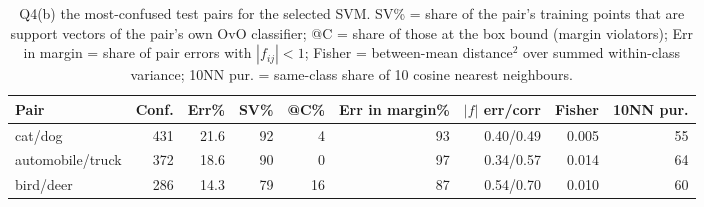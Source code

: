 \begin{table}[t]
\centering
\footnotesize
\setlength{\tabcolsep}{3.5pt}
\begin{adjustbox}{max width=\linewidth}
\begin{tabular}{lrrrrrrrr}
\toprule
Pair & Conf. & Err\% & SV\% & @C\% & Err in margin\% & $|f|$ err/corr & Fisher & 10NN pur. \\
\midrule
cat/dog & 431 & 21.6 & 92 & 4 & 93 & 0.40/0.49 & 0.005 & 55 \\
automobile/truck & 372 & 18.6 & 90 & 0 & 97 & 0.34/0.57 & 0.014 & 64 \\
bird/deer & 286 & 14.3 & 79 & 16 & 87 & 0.54/0.70 & 0.010 & 60 \\
\bottomrule
\end{tabular}
\end{adjustbox}
\caption{Q4(b) the most-confused test pairs for the selected SVM. SV\% = share of the pair's training points that are support vectors of the pair's own OvO classifier; @C = share of those at the box bound (margin violators); Err in margin = share of pair errors with $|f_{ij}|<1$; Fisher = between-mean distance$^2$ over summed within-class variance; 10NN pur. = same-class share of 10 cosine nearest neighbours.}
\label{tab:q4b}
\end{table}
